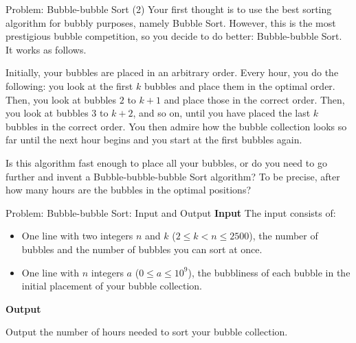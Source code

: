 \documentclass[11pt,pdf, aspectratio=169]{beamer}
\begin{document}
  \begin{frame}{Problem: Bubble-bubble Sort (2)}
    Your first thought is to use the best sorting algorithm for bubbly purposes, namely Bubble Sort.
    However, this is the most prestigious bubble competition, so you decide to do better: Bubble-bubble Sort. It works as follows.

    Initially, your bubbles are placed in an arbitrary order.
    Every hour, you do the following: you look at the first $k$ bubbles and place them in the optimal order.
    Then, you look at bubbles $2$ to $k+1$ and place those in the correct order.
    Then, you look at bubbles $3$ to $k+2$, and so on, until you have placed the last $k$ bubbles in the correct order.
    You then admire how the bubble collection looks so far until the next hour begins and you start at the first bubbles again.

    Is this algorithm fast enough to place all your bubbles, or do you need to go further and invent a Bubble-bubble-bubble Sort algorithm?
    To be precise, after how many hours are the bubbles in the optimal positions?
  \end{frame}
  \begin{frame}{Problem: Bubble-bubble Sort: Input and Output}
    \textbf{Input}
    The input consists of:
    \begin{itemize}
      \item One line with two integers $n$ and $k$ ($2 \leq k < n \leq 2500$), the number of bubbles and the number of bubbles you can sort at once.
      \item One line with $n$ integers $a$ ($0 \leq a \leq 10^9$), the bubbliness of each bubble in the initial placement of your bubble collection.
    \end{itemize}

    \textbf{Output}

    Output the number of hours needed to sort your bubble collection.
  \end{frame}
\end{document}
